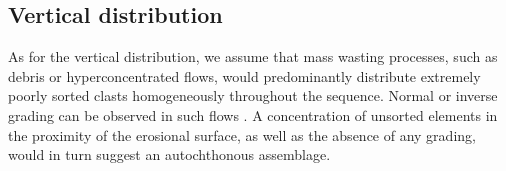 \documentclass[preprint,authoryear,times]{elsarticle} %
\begin{document}

\subsection{Vertical distribution}




As for the vertical distribution, we assume that mass wasting processes, such as debris or hyperconcentrated flows, would predominantly distribute extremely poorly sorted clasts homogeneously throughout the sequence. Normal or inverse grading can be observed in such flows \citep{Pierson2005}. A concentration of unsorted elements in the proximity of the erosional surface, as well as the absence of any grading, would in turn suggest an autochthonous assemblage.

\end{document}
